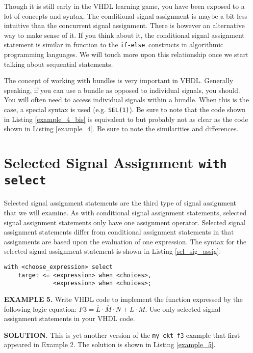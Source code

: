 Though it is still early in the VHDL learning game, you have been exposed to a lot of concepts and syntax. The conditional signal assignment is maybe a bit less intuitive than the concurrent signal assignment. There is however an alternative way to make sense of it. If you think about it, the conditional signal assignment statement is similar in function to the \texttt{if-else }constructs in algorithmic programming languages. We will touch more upon this relationship once we start talking about sequential statements.

The concept of working with bundles is very important in VHDL. Generally speaking, if you can use a bundle as opposed to individual signals, you should. You will often need to access individual signals within a bundle. When this is the case, a special syntax is used (e.g. \texttt{SEL(1)}). Be sure to note that the code shown in Listing \ref{example_4_bis} is equivalent to but probably not as clear as the code shown in Listing \ref{example_4}. Be sure to note the similarities and differences.

\section{Selected Signal Assignment \texttt{with select}}
Selected signal assignment statements are the third type of signal assignment that we will examine. As with conditional signal assignment statements, selected signal assignment statements only have one assignment operator. Selected signal assignment statements differ from conditional assignment statements in that assignments are based upon the evaluation of one expression. The syntax for the selected signal assignment statement is shown in Listing \ref{sel_sig_assig}.

\noindent
\begin{minipage}{0.99\linewidth}
\begin{lstlisting}[label=sel_sig_assig, caption=Syntax for the selected signal assignment statement.]
with <choose_expression> select
	target <= <expression> when <choices>,
	          <expression> when <choices>;
\end{lstlisting}
\end{minipage}

\begin{leftbar}
\noindent
\textbf{EXAMPLE 5.}
Write VHDL code to implement the function expressed by the following logic equation: $F3=\overline{L} \cdot \overline{M} \cdot N+L \cdot M$. Use only selected signal assignment statements in your VHDL code.
\end{leftbar}
\noindent
\textbf{SOLUTION.} This is yet another version of the \texttt{my\_ckt\_f3} example that first appeared in Example 2. The solution is shown in Listing \ref{example_5}.

